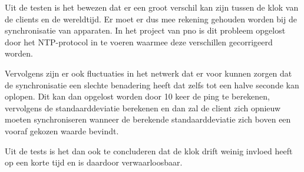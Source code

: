 Uit de testen is het bewezen dat er een groot verschil kan zijn tussen de klok van de clients en de wereldtijd. Er moet er dus mee rekening gehouden worden bij de synchronisatie van apparaten. In het project van pno is dit probleem opgelost door het NTP-protocol in te voeren waarmee deze verschillen gecorrigeerd worden.

Vervolgens zijn er ook fluctuaties in het netwerk dat er voor kunnen zorgen dat de synchronisatie een slechte benadering heeft dat zelfs tot een halve seconde kan oplopen. Dit kan dan opgelost worden door 10 keer de ping te berekenen, vervolgens de standaarddeviatie berekenen en dan zal de client zich opnieuw moeten synchroniseren wanneer de berekende standaarddeviatie zich boven een vooraf gekozen waarde bevindt.

Uit de tests is het dan ook te concluderen dat de klok drift weinig invloed heeft op een korte tijd en is daardoor verwaarloosbaar.
